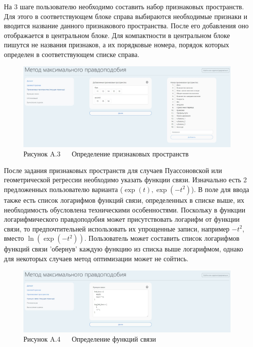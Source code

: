 На 3 шаге пользователю необходимо составить набор признаковых пространств. Для этого в соответствующем блоке справа выбираются необходимые признаки и вводится название данного признакового пространства. После его добавления оно отображается в центральном блоке. Для компактности в центральном блоке пишутся не названия признаков, а их порядковые номера, порядок которых определен в соответствующем списке справа.


\begin{figure}[H]
    \begin{center}
        \includegraphics[width=1.0\linewidth]{src/img/screens/3.jpg}
        \caption*{Рисунок A.3 ~~ Определение признаковых пространств}
        \label{fig:screen_3}
    \end{center}
\end{figure}

После задания признаковых пространств для случаев Пуассоновской или геометрической регрессии необходимо указать функции связи. Изначально есть 2 предложенных пользователю варианта ($\exp(t), \exp(-t^2)$). В поле для ввода также есть список логарифмов функций связи, определенных в списке выше, их необходимость обусловлена техническими особенностями. Поскольку в функции логарифмического правдоподобия может присутствовать логарифм от функции связи, то предпочтительней использовать их упрощенные записи, например $-t^2$, вместо $\ln(\exp(-t^2))$. Пользователь может составить список логарифмов функций связи 'обернув' каждую функцию из списка выше логарифмом, однако для некоторых случаев метод оптимизации может не сойтись.

\begin{figure}[H]
    \begin{center}
        \includegraphics[width=1.0\linewidth]{src/img/screens/4.jpg}
        \caption*{Рисунок A.4 ~~ Определение функций связи}
        \label{fig:screen_4}
    \end{center}
\end{figure}

